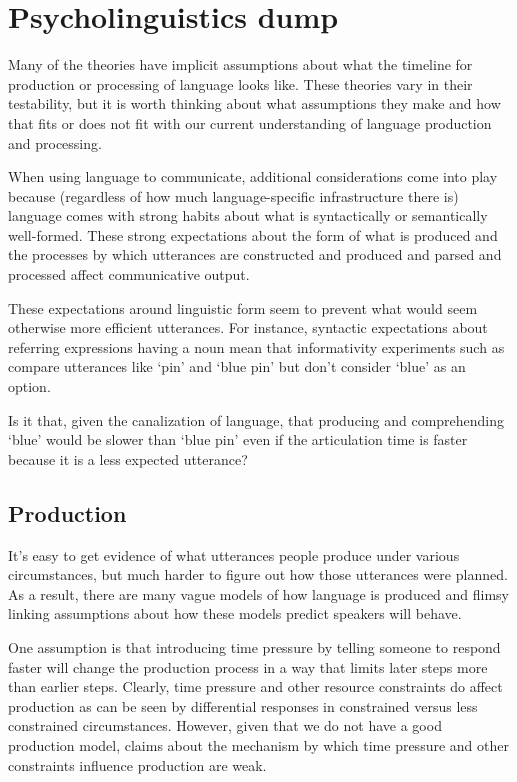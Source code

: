 \documentclass[]{article}
\begin{document}
\section{Psycholinguistics dump}

Many of the theories have implicit assumptions about what the timeline for production or processing of language looks like. These theories vary in their testability, but it is worth thinking about what assumptions they make and how that fits or does not fit with our current understanding of language production and processing. 

When using language to communicate, additional considerations come into play because (regardless of how much language-specific infrastructure there is) language comes with strong habits about what is syntactically or semantically well-formed. These strong expectations about the form of what is produced and the processes by which utterances are constructed and produced and parsed and processed affect communicative output.

These expectations around linguistic form seem to prevent what would seem otherwise more efficient utterances. For instance, syntactic expectations about referring expressions having a noun mean that informativity experiments such as \cite{degen20200406} compare utterances like `pin' and `blue pin' but don't consider `blue' as an option. 

Is it that, given the canalization of language, that producing and comprehending `blue' would be slower than `blue pin' even if the articulation time is faster because it is a less expected utterance? 


\subsection{Production}
It's easy to get evidence of what utterances people produce under various circumstances, but much harder to figure out how those utterances were planned. As a result, there are many vague models of how language is produced and flimsy linking assumptions about how these models predict speakers will behave. 


One assumption is that introducing time pressure by telling someone to respond faster will change the production process in a way that limits later steps more than earlier steps. Clearly, time pressure and other resource constraints do affect production as can be seen by differential responses in constrained versus less constrained circumstances. However, given that we do not have a good production model, claims about the mechanism by which time pressure and other constraints influence production are weak.
\end{document}

